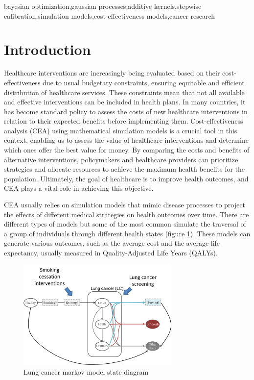 \documentclass{IOS-Book-Article}
\def\hb{\hbox to 11.5 cm{}}
\begin{document}
\begin{frontmatter}
		\begin{keyword}
			bayesian optimization\sep gaussian processes\sep additive kernels\sep stepwise calibration\sep simulation models\sep cost-effectiveness models\sep  cancer research
		\end{keyword}
	\end{frontmatter}
	\markboth{December 2023\hb}{December 2023\hb}
	
\section{Introduction}
Healthcare interventions are increasingly being evaluated based on their cost-effectiveness due to usual budgetary constraints, ensuring equitable and efficient distribution of healthcare services. These constraints mean that not all available and effective interventions can be included in health plans. In many countries, it has become standard policy to assess the costs of new healthcare interventions in relation to their expected benefits before implementing them. Cost-effectiveness analysis (CEA) using mathematical simulation models is a crucial tool in this context, enabling us to assess the value of healthcare interventions and determine which ones offer the best value for money\cite{drummond}. By comparing the costs and benefits of alternative interventions, policymakers and healthcare providers can prioritize strategies and allocate resources to achieve the maximum health benefits for the population. Ultimately, the goal of healthcare is to improve health outcomes, and CEA plays a vital role in achieving this objective\cite{levin}.

CEA usually relies on simulation models that mimic disease processes to project the effects of different medical strategies on health outcomes over time\cite{applied_he}. There are different types of models but some of the most common simulate the traversal of a group of individuals through different health states (figure \ref{fig:lung_model}). These models can generate various outcomes, such as the average cost and the average life expectancy, usually measured in Quality-Adjusted Life Years (QALYs)\cite{qalys}.

\begin{figure}[h!]
	\centering	
	\includegraphics[width=80mm]{figs/lungmodel.pdf}		
	\caption{Lung cancer markov model state diagram}	
	\label{fig:lung_model}	
\end{figure}
\end{document}
